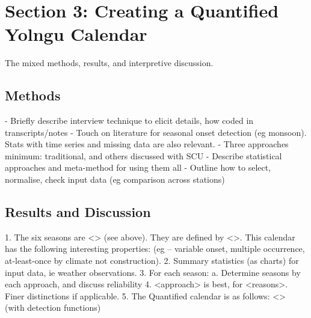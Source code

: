 \chapter{Section 3:  Creating a Quantified Yolngu Calendar}
The mixed methods, results, and interpretive discussion.

\section{Methods}
-	Briefly describe interview technique to elicit details, how coded in transcripts/notes
-	Touch on literature for seasonal onset detection (eg monsoon).  Stats with time series and missing data are also relevant.
-	Three approaches minimum:  traditional, and others discussed with SCU
-	Describe statistical approaches and meta-method for using them all
-	Outline how to select, normalise, check input data (eg comparison across stations)

\section{Results and Discussion}
1.	The six seasons are <> (see above).  They are defined by <>.  This calendar has the following interesting properties:  (eg – variable onset, multiple occurrence, at-least-once by climate not construction).
2.	Summary statistics (as charts) for input data, ie weather observations.
3.	For each season:
a.	Determine seasons by each approach, and discuss reliability
4.	<approach> is best, for <reasons>.  Finer distinctions if applicable.
5.	The Quantified calendar is as follows:  <> (with detection functions)


